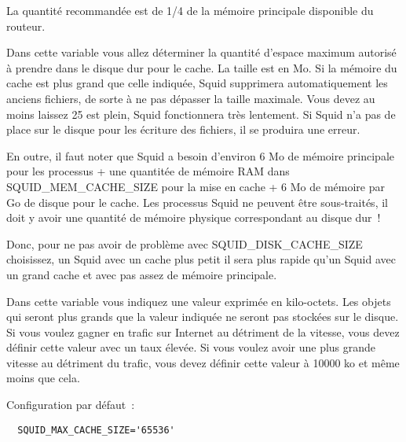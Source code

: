 \begin{description}
                La quantité recommandée est de 1/4 de la mémoire principale
                disponible du routeur.



                Dans cette variable vous allez déterminer la quantité d'espace
                maximum autorisé à prendre dans le disque dur pour le cache. La
                taille est en Mo. Si la mémoire du cache est plus grand que celle
                indiquée, Squid supprimera automatiquement les anciens fichiers,
                de sorte à ne pas dépasser la taille maximale. Vous devez au moins
                laissez 25 %
                est plein, Squid fonctionnera très lentement. Si Squid n'a pas
                de place sur le disque pour les écriture des fichiers, il se
                produira une erreur.

                En outre, il faut noter que Squid a besoin d'environ 6 Mo de
                mémoire principale pour les processus + une quantitée de mémoire
                RAM dans SQUID\_MEM\_CACHE\_SIZE pour la mise en cache + 6 Mo
                de mémoire par Go de disque pour le cache. Les processus Squid
                ne peuvent être sous-traités, il doit y avoir une quantité de
                mémoire physique correspondant au disque dur~!

                Donc, pour ne pas avoir de problème avec SQUID\_DISK\_CACHE\_SIZE
                choisissez, un Squid avec un cache plus petit il sera plus rapide
                qu'un Squid avec un grand cache et avec pas assez de mémoire
                principale.



                Dans cette variable vous indiquez une valeur exprimée en
                kilo-octets. Les objets qui seront plus grands que la valeur
                indiquée ne seront pas stockées sur le disque. Si vous voulez
                gagner en trafic sur Internet au détriment de la vitesse, vous
                devez définir cette valeur avec un taux élevée. Si vous voulez
                avoir une plus grande vitesse au détriment du trafic, vous devez
                définir cette valeur à 10000 ko et même moins que cela.

                Configuration par défaut~:
\begin{verbatim}
  SQUID_MAX_CACHE_SIZE='65536'
\end{verbatim}



\end{description}
